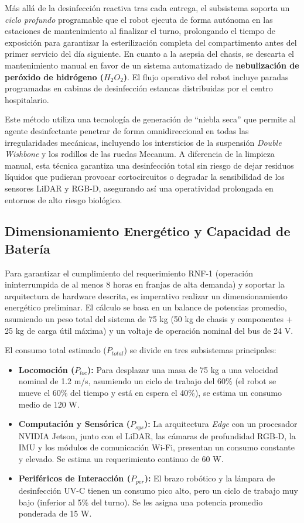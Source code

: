 Más allá de la desinfección reactiva tras cada entrega, el subsistema soporta un \textit{ciclo profundo} programable que el robot ejecuta de forma autónoma en las estaciones de mantenimiento al finalizar el turno, prolongando el tiempo de exposición para garantizar la esterilización completa del compartimento antes del primer servicio del día siguiente. En cuanto a la asepsia del chasis, se descarta el mantenimiento manual en favor de un sistema automatizado de \textbf{nebulización de peróxido de hidrógeno ($H_2O_2$)}. El flujo operativo del robot incluye paradas programadas en cabinas de desinfección estancas distribuidas por el centro hospitalario. 

Este método utiliza una tecnología de generación de ``niebla seca'' que permite al agente desinfectante penetrar de forma omnidireccional en todas las irregularidades mecánicas, incluyendo los intersticios de la suspensión \textit{Double Wishbone} y los rodillos de las ruedas Mecanum. A diferencia de la limpieza manual, esta técnica garantiza una desinfección total sin riesgo de dejar residuos líquidos que pudieran provocar cortocircuitos o degradar la sensibilidad de los sensores LiDAR y RGB-D, asegurando así una operatividad prolongada en entornos de alto riesgo biológico.

\subsection*{Dimensionamiento Energético y Capacidad de Batería}
Para garantizar el cumplimiento del requerimiento RNF-1 (operación ininterrumpida de al menos 8 horas en franjas de alta demanda) y soportar la arquitectura de hardware descrita, es imperativo realizar un dimensionamiento energético preliminar. El cálculo se basa en un balance de potencias promedio, asumiendo un peso total del sistema de 75 kg (50 kg de chasis y componentes + 25 kg de carga útil máxima) y un voltaje de operación nominal del bus de 24 V.

El consumo total estimado ($P_{total}$) se divide en tres subsistemas principales:
\begin{itemize}
	\item \textbf{Locomoción ($P_{loc}$):} Para desplazar una masa de 75 kg a una velocidad nominal de 1.2 m/s, asumiendo un ciclo de trabajo del 60\% (el robot se mueve el 60\% del tiempo y está en espera el 40\%), se estima un consumo medio de 120 W.
	\item \textbf{Computación y Sensórica ($P_{sys}$):} La arquitectura \textit{Edge} con un procesador NVIDIA Jetson, junto con el LiDAR, las cámaras de profundidad RGB-D, la IMU y los módulos de comunicación Wi-Fi, presentan un consumo constante y elevado. Se estima un requerimiento continuo de 60 W.
	\item \textbf{Periféricos de Interacción ($P_{per}$):} El brazo robótico y la lámpara de desinfección UV-C tienen un consumo pico alto, pero un ciclo de trabajo muy bajo (inferior al 5\% del turno). Se les asigna una potencia promedio ponderada de 15 W.
\end{itemize}

